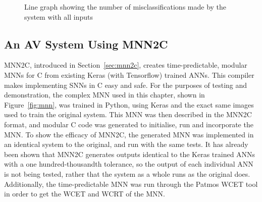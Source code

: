 
\begin{figure}[t]
	\centering
	\scalebox{0.9}{}
	\caption{Line graph showing the number of misclassifications made by the system with all inputs \label{fig:sign-graphboth}}
\end{figure}


\subsection{An \ac{AV} System Using \acf{MNN2C}}
\ac{MNN2C}, introduced in Section~\ref{sec:mnn2c}, creates time-predictable, modular \acfp{MNN} for C from existing Keras (with Tensorflow) trained \acp{ANN}. 
This compiler makes implementing \acfp{SNN} in C easy and safe.
For the purposes of testing and demonstration, the complex \ac{MNN} used in this chapter, shown in Figure~\ref{fig:mnn}, was trained in Python, using Keras and the exact same images used to train the original system.
This \ac{MNN} was then described in the \ac{MNN2C} format, and modular C code was generated to initialise, run and incorporate the \ac{MNN}.
To show the efficacy of \ac{MNN2C}, the generated \ac{MNN} was implemented in an identical system to the original, and run with the same tests. 
It has already been shown that \ac{MNN2C} generates outputs identical to the Keras trained \acp{ANN} with a one hundred-thousandth tolerance, so the output of each individual \ac{ANN} is not being tested, rather that the system as a whole runs as the original does.
Additionally, the time-predictable \ac{MNN} was run through the Patmos \ac{WCET} tool in order to get the \ac{WCET} and \ac{WCRT} of the \ac{MNN}.

